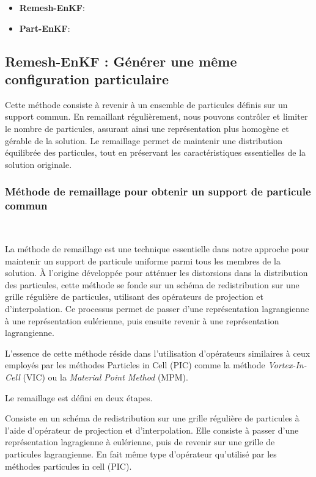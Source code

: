\begin{itemize}
    \item \textbf{Remesh-EnKF}: \\
    \item \textbf{Part-EnKF}: \\
\end{itemize}

\subsection{Remesh-EnKF : Générer une même configuration particulaire}

Cette méthode consiste à revenir à un ensemble de particules définis sur un support commun. En remaillant régulièrement, nous pouvons contrôler et limiter le nombre de particules, assurant ainsi une représentation plus homogène et gérable de la solution. Le remaillage permet de maintenir une distribution équilibrée des particules, tout en préservant les caractéristiques essentielles de la solution originale.

\subsubsection*{Méthode de remaillage pour obtenir un support de particule commun}~\label{sec:remesh}

La méthode de remaillage est une technique essentielle dans notre approche pour maintenir un support de particule uniforme parmi tous les membres de la solution. À l'origine développée pour atténuer les distorsions dans la distribution des particules, cette méthode se fonde sur un schéma de redistribution sur une grille régulière de particules, utilisant des opérateurs de projection et d'interpolation. Ce processus permet de passer d'une représentation lagrangienne à une représentation eulérienne, puis ensuite revenir à une représentation lagrangienne.

L'essence de cette méthode réside dans l'utilisation d'opérateurs similaires à ceux employés par les méthodes Particles in Cell (PIC) comme la méthode \textit{Vortex-In-Cell} (VIC) ou la \textit{Material Point Method} (MPM).

Le remaillage est défini en deux étapes.

Consiste en un schéma de redistribution sur une grille régulière de particules à l'aide d'opérateur de projection et d'interpolation. Elle consiste à passer d'une représentation lagragienne à eulérienne, puis de revenir sur une grille de particules lagrangienne. En fait même type d'opérateur qu'utilisé par les méthodes particules in cell (PIC).

